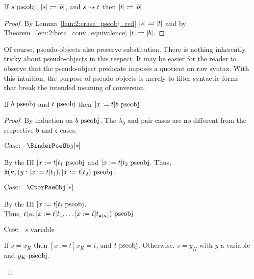 \begin{lemma}
    \label{lem:2:pseobj_red_f_step}
    If $s~\textnormal{pseobj}$, $|s| \rightleftharpoons |b|$, and $s \leadsto t$ then $|t| \rightleftharpoons |b|$
\end{lemma}
\begin{proof}
    By Lemma~\ref{lem:2:erase_pseobj_red} $|s| \rightleftharpoons |t|$ and by Theorem~\ref{lem:2:beta_conv_equivalence} $|t| \rightleftharpoons |b|$.
\end{proof}

Of course, pseudo-objects also preserve substitution.
There is nothing inherently tricky about pseudo-objects in this respect.
It may be easier for the reader to observe that the pseudo-object predicate imposes a quotient on raw syntax.
With this intuition, the purpose of pseudo-objects is merely to filter syntactic forms that break the intended meaning of conversion.

\begin{lemma}
    \label{lem:2:pseobj_subst}
    If $b~\textnormal{pseobj}$ and $t~\textnormal{pseobj}$ then $[x := t]b~\textnormal{pseobj}$
\end{lemma}
\begin{proof}
    By induction on $b~\textnormal{pseobj}$. The $\lambda_0$ and pair cases are no different from the respective $\mathfrak{b}$ and $\mathfrak{c}$ cases.

    $\text{Case: }\begin{array}{c} \BinderPseObj[*] \end{array}$
    \begin{proofcase}
        By the IH $[x := t]t_1~\textnormal{pseobj}$ and $[x := t]t_2~\textnormal{pseobj}$.
        Thus, $\mathfrak{b}(\kappa, (y : [x := t]t_1), [x := t]t_2)~\textnormal{pseobj}$.
    \end{proofcase}

    $\text{Case: }\begin{array}{c} \CtorPseObj[*] \end{array}$
    \begin{proofcase}
        By the IH $[x := t]t_i~\textnormal{pseobj}$. \\
        Thus, $\mathfrak{c}(\kappa, [x := t]t_1, \ldots [x := t]t_{\mathfrak{a}(\kappa)})~\textnormal{pseobj}$.
    \end{proofcase}

    $\text{Case: }\begin{array}{c} s\text{ variable} \end{array}$
    \begin{proofcase}
        If $s = x_K$ then $[x := t]x_K = t$, and $t~\textnormal{pseobj}$.
        Otherwise, $s = y_K$ with $y$ a variable and $y_K~\textnormal{pseobj}$.
    \end{proofcase}
\end{proof}


